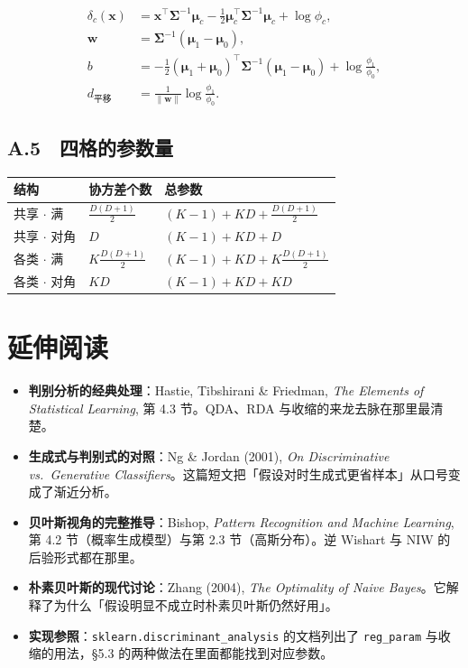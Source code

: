\documentclass[11pt,a4paper,fontset=windows,zihao=-4]{ctexart}
\newcommand{\bw}{\mathbf{w}}
\newcommand{\bx}{\mathbf{x}}
\newcommand{\bSigma}{\boldsymbol{\Sigma}}
\newcommand{\bmu}{\boldsymbol{\mu}}
\newcommand{\tp}{^{\top}}
\newcommand{\norm}[1]{\lVert #1\rVert}
\newcommand{\tabhead}{\sffamily\bfseries\color{navy}}
\begin{document}
\begin{align}
  \delta_c(\bx)&=\bx\tp\bSigma^{-1}\bmu_c-\tfrac12\bmu_c\tp\bSigma^{-1}\bmu_c+\log\phi_c,\\
  \bw&=\bSigma^{-1}(\bmu_1-\bmu_0),\\
  b&=-\tfrac12(\bmu_1+\bmu_0)\tp\bSigma^{-1}(\bmu_1-\bmu_0)+\log\frac{\phi_1}{\phi_0},\\
  d_{\text{平移}}&=\frac{1}{\norm{\bw}}\log\frac{\phi_1}{\phi_0}.
\end{align}

\subsection*{A.5　四格的参数量}

\begin{center}
\small
\begin{tabular}{@{}lll@{}}
\toprule
\rowcolor{navy!7}
\tabhead 结构 & \tabhead 协方差个数 & \tabhead 总参数\\
\midrule
共享 $\cdot$ 满 & $\frac{D(D+1)}{2}$ & $(K-1)+KD+\frac{D(D+1)}{2}$\\
共享 $\cdot$ 对角 & $D$ & $(K-1)+KD+D$\\
各类 $\cdot$ 满 & $K\frac{D(D+1)}{2}$ & $(K-1)+KD+K\frac{D(D+1)}{2}$\\
各类 $\cdot$ 对角 & $KD$ & $(K-1)+KD+KD$\\
\bottomrule
\end{tabular}
\end{center}

\section{延伸阅读}

\begin{itemize}
  \item \textbf{判别分析的经典处理}：Hastie, Tibshirani \& Friedman, \emph{The Elements of Statistical Learning}, 第 4.3 节。QDA、RDA 与收缩的来龙去脉在那里最清楚。
  \item \textbf{生成式与判别式的对照}：Ng \& Jordan (2001), \emph{On Discriminative vs.\ Generative Classifiers}。这篇短文把「假设对时生成式更省样本」从口号变成了渐近分析。
  \item \textbf{贝叶斯视角的完整推导}：Bishop, \emph{Pattern Recognition and Machine Learning}, 第 4.2 节（概率生成模型）与第 2.3 节（高斯分布）。逆 Wishart 与 NIW 的后验形式都在那里。
  \item \textbf{朴素贝叶斯的现代讨论}：Zhang (2004), \emph{The Optimality of Naive Bayes}。它解释了为什么「假设明显不成立时朴素贝叶斯仍然好用」。
  \item \textbf{实现参照}：\texttt{sklearn.discriminant\_analysis} 的文档列出了 \texttt{reg\_param} 与收缩的用法，§5.3 的两种做法在里面都能找到对应参数。
\end{itemize}
\end{document}
